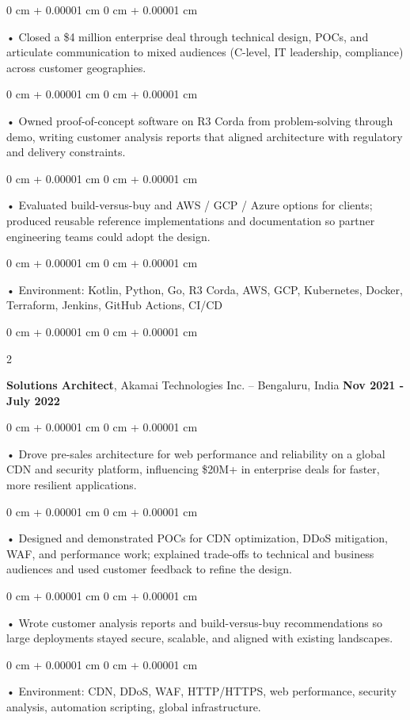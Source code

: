 \documentclass[10pt, letterpaper]{article}
\newenvironment{onecolentry}{
    \begin{adjustwidth}{
        0 cm + 0.00001 cm
    }{
        0 cm + 0.00001 cm
    }
}{
    \end{adjustwidth}
} %
\newenvironment{twocolentry}[2][]{
    \onecolentry
    \def\secondColumn{#2}
    \setcolumnwidth{\fill, 4.5 cm}
    \begin{paracol}{2}
}{
    \switchcolumn \raggedleft \secondColumn
    \end{paracol}
    \endonecolentry
} %
\begin{document}
        \begin{onecolentry}
             • Closed a \$4 million enterprise deal through technical design, POCs, and articulate communication to mixed audiences (C-level, IT leadership, compliance) across customer geographies.
        \end{onecolentry}
        \begin{onecolentry}
             • Owned proof-of-concept software on R3 Corda from problem-solving through demo, writing customer analysis reports that aligned architecture with regulatory and delivery constraints.
        \end{onecolentry}
        \begin{onecolentry}
             • Evaluated build-versus-buy and AWS / GCP / Azure options for clients; produced reusable reference implementations and documentation so partner engineering teams could adopt the design.
        \end{onecolentry}
        \begin{onecolentry}
             • Environment: Kotlin, Python, Go, R3 Corda, AWS, GCP, Kubernetes, Docker, Terraform, Jenkins, GitHub Actions, CI/CD
        \end{onecolentry}
        \vspace{0.1cm}

        \begin{twocolentry}{
            \textbf{Nov 2021 - July 2022}
        }
            \textbf{Solutions Architect}, Akamai Technologies Inc. -- Bengaluru, India \end{twocolentry}
        \begin{onecolentry}
            • Drove pre-sales architecture for web performance and reliability on a global CDN and security platform, influencing \$20M+ in enterprise deals for faster, more resilient applications.
        \end{onecolentry}
        \begin{onecolentry}
            • Designed and demonstrated POCs for CDN optimization, DDoS mitigation, WAF, and performance work; explained trade-offs to technical and business audiences and used customer feedback to refine the design.
        \end{onecolentry}
        \begin{onecolentry}
             • Wrote customer analysis reports and build-versus-buy recommendations so large deployments stayed secure, scalable, and aligned with existing landscapes.
        \end{onecolentry}
        \begin{onecolentry}
             • Environment: CDN, DDoS, WAF, HTTP/HTTPS, web performance, security analysis, automation scripting, global infrastructure.
        \end{onecolentry}
\end{document}
